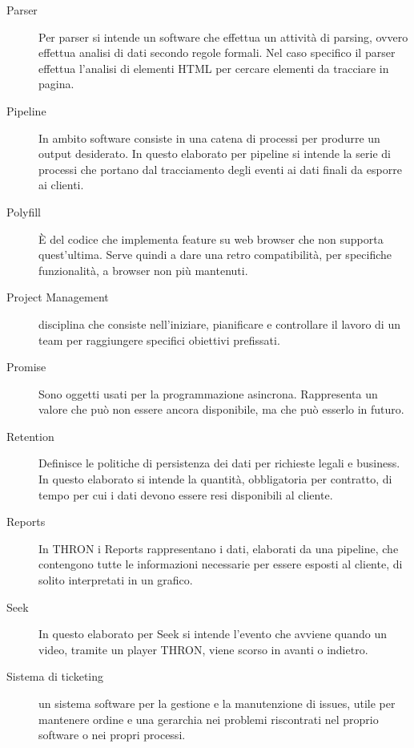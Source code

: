 \documentclass[a4paper, 12pt, twoside, openright]{book}
\begin{document}
\begin {description}
\item[Parser]
Per parser si intende un software che effettua un attività di parsing, ovvero effettua analisi di dati secondo regole formali. Nel caso specifico il parser effettua l'analisi di elementi HTML per cercare elementi da tracciare in pagina.
\item[Pipeline]
In ambito software consiste in una catena di processi per produrre un output desiderato. In questo elaborato per pipeline si intende la serie di processi che portano dal tracciamento degli eventi ai dati finali da esporre ai clienti.
\item[Polyfill]
\`{E} del codice che implementa feature su web browser che non supporta quest'ultima. Serve quindi a dare una retro compatibilità, per specifiche funzionalità, a browser non più mantenuti.
\item[Project Management]
disciplina che consiste nell'iniziare, pianificare e controllare il lavoro di un team per raggiungere specifici obiettivi prefissati.
\item[Promise]
Sono oggetti usati per la programmazione asincrona. Rappresenta un valore che può non essere ancora disponibile, ma che può esserlo in futuro.

\item[Retention]
Definisce le politiche di persistenza dei dati per richieste legali e business. In questo elaborato si intende la quantità, obbligatoria per contratto, di tempo per cui i dati devono essere resi disponibili al cliente.
\item[Reports]
In THRON i Reports rappresentano i dati, elaborati da una pipeline, che contengono tutte le informazioni necessarie per essere esposti al cliente, di solito interpretati in un grafico.

\item[Seek]
In questo elaborato per Seek si intende l'evento che avviene quando un video, tramite un player THRON, viene scorso in avanti o indietro.
\item[Sistema di ticketing]
un sistema software per la gestione e la manutenzione di issues, utile per mantenere ordine e una gerarchia nei problemi riscontrati nel proprio software o nei propri processi.


\end{description}
\end{document}
